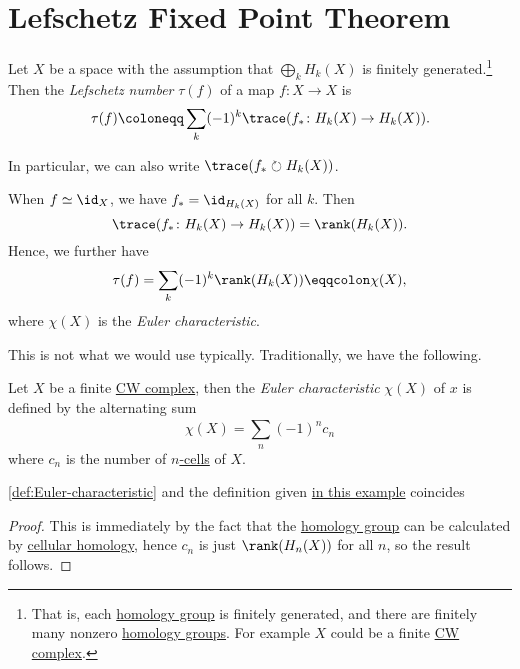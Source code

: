 \section{Lefschetz Fixed Point Theorem}
\begin{definition}\label{def:Lefschetz-number}
	Let \(X\) be a space with the assumption that \(\bigoplus_k H_k(X)\) is finitely generated.\footnote{That is, each \hyperref[def:homology-group]{homology group} is finitely	generated, and there are finitely many nonzero \hyperref[def:homology-group]{homology groups}. For example \(X\) could be a finite \hyperref[def:CW-Complex]{CW complex}.}
	Then the \emph{Lefschetz number} \(\tau(f)\) of a map \(f \colon X \to X\) is
	\[
		\tau(f) \coloneqq \sum_k (-1)^k \trace(f_\ast \colon H_k(X) \to H_k(X)).
	\]
\end{definition}

\begin{remark}
	In particular, we can also write \(\trace(f_{\ast} \circlearrowright H_{k} (X))\).
\end{remark}

\begin{eg}\label{eg:lec36}
	When \(f \simeq \id _X\), we have \(f_\ast = \id_{H_k(X)}\) for all \(k\). Then
	\[
		\trace(f_\ast \colon H_k(X) \to H_k(X)) = \rank(H_k(X)).
	\]
	Hence, we further have
	\[
		\tau(f) = \sum_k (-1)^k\rank(H_k(X)) \eqqcolon \chi(X),
	\]
	where \(\chi(X)\) is the \emph{Euler characteristic}.
\end{eg}

This is not what we would use typically. Traditionally, we have the following.

\begin{definition}\label{def:Euler-characteristic}
	Let \(X\) be a finite \hyperref[def:CW-Complex]{CW complex}, then the \emph{Euler characteristic} \(\chi (X)\) of \(x\) is defined by the alternating sum
	\[
		\chi (X) = \sum_{n}^{} (-1)^{n} c_{n}
	\]
	where \(c_{n} \) is the number of \hyperref[def:cell]{\(n\)-cells} of \(X\).
\end{definition}

\begin{proposition}
	\autoref{def:Euler-characteristic} and the definition given \hyperref[eg:lec36]{in this example} coincides
\end{proposition}
\begin{proof}
	This is immediately by the fact that the \hyperref[def:homology-group]{homology group} can be calculated by \hyperref[def:cellular-homology-group]{cellular homology}, hence \(c_{n}\) is just \(\rank(H_{n} (X))\) for all \(n\), so the result follows.
\end{proof}

